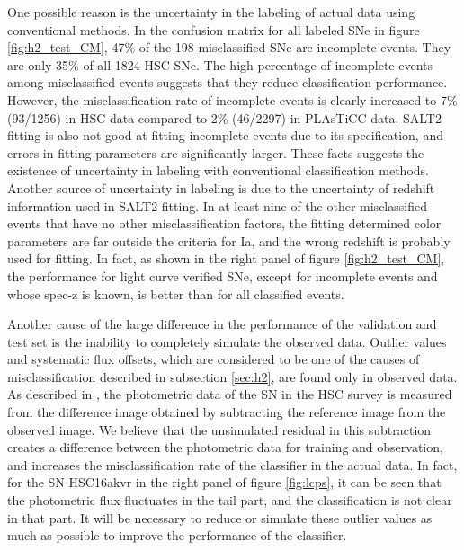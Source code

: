 \documentclass[useamsfonts]{pasj01}
\begin{document}
One possible reason is the uncertainty in the labeling of actual data using conventional methods.
In the confusion matrix for all labeled SNe in figure \ref{fig:h2_test_CM}, 47\% of the 198 misclassified SNe are incomplete events.
They are only 35\% of all 1824 HSC SNe.
The high percentage of incomplete events among misclassified events suggests that they reduce classification performance. %
However, the misclassification rate of incomplete events is clearly increased to 7\% (93/1256) in HSC data compared to 2\% (46/2297) in PLAsTiCC data.
SALT2 fitting is also not good at fitting incomplete events due to its specification, and errors in fitting parameters are significantly larger.
These facts suggests the existence of uncertainty in labeling with conventional classification methods.
Another source of uncertainty in labeling is due to the uncertainty of redshift information used in SALT2 fitting.
In at least nine of the other misclassified events that have no other misclassification factors, the fitting determined color parameters are far outside the criteria for Ia, and the wrong redshift is probably used for fitting.
In fact, as shown in the right panel of figure \ref{fig:h2_test_CM}, the performance for light curve verified SNe, except for incomplete events and whose spec-z is known, is better than for all classified events.

Another cause of the large difference in the performance of the validation and test set is the inability to completely simulate the observed data.
Outlier values and systematic flux offsets, which are considered to be one of the causes of misclassification described in subsection \ref{sec:h2}, are found only in observed data.
As described in \citet{yasuda19a}, the photometric data of the SN in the HSC survey is measured from the difference image obtained by subtracting the reference image from the observed image.
We believe that the unsimulated residual in this subtraction creates a difference between the photometric data for training and observation, and increases the misclassification rate of the classifier in the actual data.
In fact, for the SN HSC16akvr in the right panel of figure \ref{fig:lcps}, it can be seen that the photometric flux fluctuates in the tail part, and the classification is not clear in that part.
It will be necessary to reduce or simulate these outlier values as much as possible to improve the performance of the classifier.
%
%
%
\end{document}
